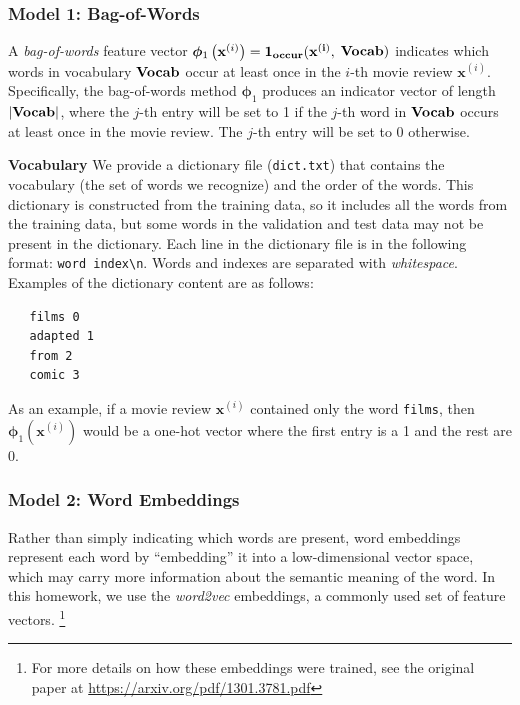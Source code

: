 \documentclass[11pt,addpoints,answers]{exam}
\newcommand{\xv}{\mathbf{x}}
\begin{document}
\subsubsection{Model 1: Bag-of-Words}

A \emph{bag-of-words} feature vector $\boldsymbol{\phi}_1\left(\xv^{(i)}\right) = \bf{1}_{occur}( \xv^{(i)},$ $\bf{Vocab})$ indicates which words in vocabulary $\bf{Vocab}$ occur at least once in the $i$-th movie review $\xv^{(i)}$. Specifically, the bag-of-words method $\boldsymbol{\phi}_1$ produces an indicator vector of length $|\bf{Vocab}|$, where the $j$-th entry will be set to 1 if the $j$-th word in $\bf{Vocab}$ occurs at least once in the movie review. The $j$-th entry will be set to 0 otherwise. %

{\bf Vocabulary }
We provide a dictionary file (\lstinline{dict.txt}) that contains the vocabulary (the set of words we recognize) and the order of the words. This dictionary is constructed from the training data, so it includes all the words from the training data, but some words in the validation and test data may not be present in the dictionary. Each line in the dictionary file is in the following format: \lstinline{word index\n}. Words and indexes are separated with \emph{whitespace}. Examples of the dictionary content are as follows:
\begin{lstlisting}
   films 0
   adapted 1
   from 2
   comic 3
\end{lstlisting}

As an example, if a movie review $\xv^{(i)}$ contained only the word \lstinline{films}, then $\boldsymbol{\phi}_1\left(\xv^{(i)}\right)$ would be a one-hot vector where the first entry is a 1 and the rest are 0.

\subsubsection{Model 2: Word Embeddings}

Rather than simply indicating which words are present, word embeddings represent each word by ``embedding'' it into a low-dimensional vector space, which may carry more information about the semantic meaning of the word. In this homework, we use the \emph{word2vec} embeddings, a commonly used set of feature vectors. \footnote{For more details on how these embeddings were trained, see the original paper at  \url{https://arxiv.org/pdf/1301.3781.pdf}}
\end{document}
